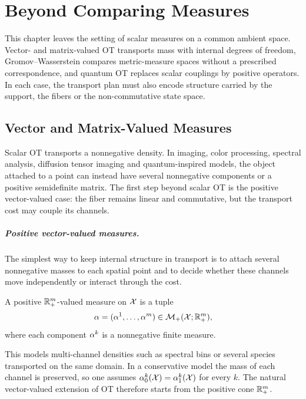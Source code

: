 
\chapter{Beyond Comparing Measures}
\label{sec-beyond-comparing-measures}

This chapter leaves the setting of scalar measures on a common ambient space. Vector- and matrix-valued OT transports mass with internal degrees of freedom, Gromov--Wasserstein compares metric-measure spaces without a prescribed correspondence, and quantum OT replaces scalar couplings by positive operators. In each case, the transport plan must also encode structure carried by the support, the fibers or the non-commutative state space.

\section{Vector and Matrix-Valued Measures}
\label{sec-vector-matrix-valued-measures}

Scalar OT transports a nonnegative density. In imaging, color processing, spectral analysis, diffusion tensor imaging and quantum-inspired models, the object attached to a point can instead have several nonnegative components or a positive semidefinite matrix. The first step beyond scalar OT is the positive vector-valued case: the fiber remains linear and commutative, but the transport cost may couple its channels.

\paragraph{Positive vector-valued measures.}

The simplest way to keep internal structure in transport is to attach several nonnegative masses to each spatial point and to decide whether these channels move independently or interact through the cost.
\begin{defn}\label{def-positive-vector-valued-measure}
	A positive $\mathbb{R}_+^m$-valued measure on $\mathcal{X}$ is a tuple
	\[
		\alpha=(\alpha^1,\ldots,\alpha^m)\in\mathcal{M}_+(\mathcal{X};\mathbb{R}_+^m),
	\]
	where each component $\alpha^k$ is a nonnegative finite measure.
\end{defn}
This models multi-channel densities such as spectral bins or several species transported on the same domain. In a conservative model the mass of each channel is preserved, so one assumes $\alpha_0^k(\mathcal{X})=\alpha_1^k(\mathcal{X})$ for every $k$. The natural vector-valued extension of OT therefore starts from the positive cone $\mathbb{R}_+^m$.

